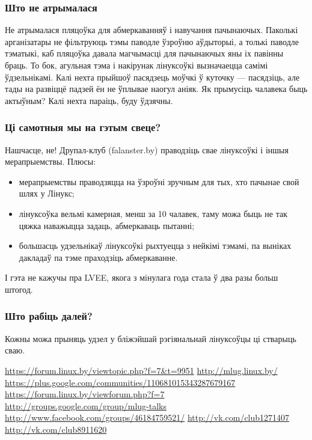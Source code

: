 \documentclass[10pt, a5paper]{article}
\begin{document}
\subsubsection*{Што не атрымалася}

Не атрымалася пляцоўка для абмеркаванняў і навучання пачынаючых. Паколькі арганізатары не фільтруюць тэмы паводле ўзроўню аўдыторыі, а толькі паводле тэматыкі, каб пляцоўка давала магчымасці для пачынаючых яны іх павінны браць. То бок, агульная тэма і накірунак лінуксоўкі вызначаецца самімі ўдзельнікамі. Калі нехта прыйшоў пасядзець моўчкі ў куточку — пасядзіць, але тады на развіццё падзей ён не ўплывае наогул аніяк. Як прымусіць чалавека быць актыўным? Калі нехта параіць, буду ўдзячны.

\subsubsection*{Ці самотныя мы на гэтым свеце?}

Нашчасце, не! Друпал-клуб (falanster.by) праводзіць свае лінуксоўкі і іншыя мерапрыемствы.
Плюсы:

\begin{itemize}
  \item мерапрыемствы праводзяцца на ўзроўні зручным для тых, хто пачынае свой шлях у Лінукс;
  \item лінуксоўка вельмі камерная, менш за 10 чалавек, таму можа быць не так цяжка наважыцца задаць, абмеркаваць пытанні;
  \item большасць удзельнікаў лінуксоўкі рыхтуецца з нейкімі тэмамі, па выніках дакладаў па тэме праходзіць абмеркаванне.
\end{itemize}

І гэта не кажучы пра LVEE, якога з мінулага года стала ў два разы больш штогод.

\subsubsection*{Што рабіць далей?}

Кожны можа прыняць удзел у бліжэйшай рэгіянальнай лінуксоўцы ці стварыць сваю. 

\let\saverefname=\refname%
\def\refname{Спасылкі}%
\begin{thebibliography}{9}
 \url{https://forum.linux.by/viewtopic.php?f=7\&t=9951}
 \url{http://mlug.linux.by/}
 \url{https://plus.google.com/communities/110681015343287679167}
 \url{https://forum.linux.by/viewforum.php?f=7}
 \url{http://groups.google.com/group/mlug-talks}
 \url{http://www.facebook.com/groups/46184759521/}
 \url{http://vk.com/club1271407}
 \url{http://vk.com/club8911620}
\end{thebibliography}
\let\refname=\saverefname%
\end{document}
